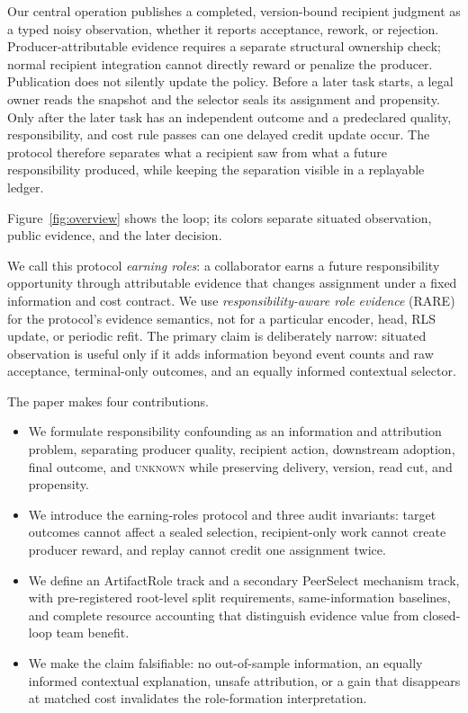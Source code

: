 \documentclass[sigconf,anonymous]{aamas}
\newcommand{\unknown}{\textsc{unknown}}
\begin{document}
Our central operation publishes a completed, version-bound recipient judgment as a typed noisy observation, whether it reports acceptance, rework, or rejection. Producer-attributable evidence requires a separate structural ownership check; normal recipient integration cannot directly reward or penalize the producer. Publication does not silently update the policy. Before a later task starts, a legal owner reads the snapshot and the selector seals its assignment and propensity. Only after the later task has an independent outcome and a predeclared quality, responsibility, and cost rule passes can one delayed credit update occur. The protocol therefore separates what a recipient saw from what a future responsibility produced, while keeping the separation visible in a replayable ledger.

Figure~\ref{fig:overview} shows the loop; its colors separate situated observation, public evidence, and the later decision.

We call this protocol \emph{earning roles}: a collaborator earns a future responsibility opportunity through attributable evidence that changes assignment under a fixed information and cost contract. We use \emph{responsibility-aware role evidence} (RARE) for the protocol's evidence semantics, not for a particular encoder, head, RLS update, or periodic refit. The primary claim is deliberately narrow: situated observation is useful only if it adds information beyond event counts and raw acceptance, terminal-only outcomes, and an equally informed contextual selector.

The paper makes four contributions.
\begin{itemize}
  \item We formulate responsibility confounding as an information and attribution problem, separating producer quality, recipient action, downstream adoption, final outcome, and \unknown{} while preserving delivery, version, read cut, and propensity.
  \item We introduce the earning-roles protocol and three audit invariants: target outcomes cannot affect a sealed selection, recipient-only work cannot create producer reward, and replay cannot credit one assignment twice.
  \item We define an ArtifactRole track and a secondary PeerSelect mechanism track, with pre-registered root-level split requirements, same-information baselines, and complete resource accounting that distinguish evidence value from closed-loop team benefit.
  \item We make the claim falsifiable: no out-of-sample information, an equally informed contextual explanation, unsafe attribution, or a gain that disappears at matched cost invalidates the role-formation interpretation.
\end{itemize}
\end{document}

